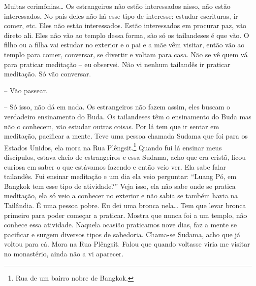 Muitas cerimônias\ldots{} Os estrangeiros não estão interessados nisso, não
estão interessados. No país deles não há esse tipo de interesse:
estudar escrituras, ir comer, etc. Eles não estão interessados. Estão
interessados em procurar paz, vão direto ali. Eles não vão ao templo
dessa forma, são só os tailandeses é que vão. O filho ou a filha vai
estudar no exterior e o pai e a mãe vêm visitar, então vão ao templo
para comer, conversar, se divertir e voltam para casa. Não se vê quem
vá para praticar meditação – eu observei. Não vi nenhum tailandês ir
praticar meditação. Só vão conversar.

-- Vão passear.

-- Só isso, não dá em nada. Os estrangeiros não fazem assim, eles
buscam o verdadeiro ensinamento do Buda. Os tailandeses têm o
ensinamento do Buda mas não o conhecem, vão estudar outras coisas. Por
lá tem que ir sentar em meditação, pacificar a mente. Teve uma pessoa
chamada Sudama que foi para os Estados Unidos, ela mora na Rua
Plêngsit.\footnote{Rua de um bairro nobre de Bangkok.} Quando fui lá
ensinar meus discípulos, estava cheio de estrangeiros e essa Sudama,
acho que era cristã, ficou curiosa em saber o que estávamos fazendo e
então veio ver. Ela sabe falar tailandês. Fui ensinar meditação e um
dia ela veio perguntar: “Luang Pó, em Bangkok tem esse tipo de
atividade?” Veja isso, ela não sabe onde se pratica meditação, ela só
veio a conhecer no exterior e não sabia se também havia na Tailândia. É
uma pessoa pobre. Eu dei uma bronca nela\ldots{} Tem que levar bronca primeiro
para poder começar a praticar. Mostra que nunca foi a um templo, não
conhece essa atividade. Naquela ocasião praticamos nove dias, faz a
mente se pacificar e surgem diversos tipos de sabedoria. Chama-se
Sudama, acho que já voltou para cá. Mora na Rua Plêngsit. Falou que
quando voltasse viria me visitar no monastério, ainda não a vi
aparecer.

